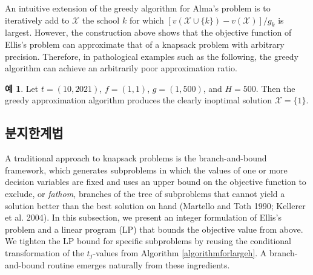 \documentclass[12pt]{article} %
\newif\ifen
\theoremstyle{definition}
\newtheorem{example}{Example}
\theoremstyle{definition}
\newtheorem{example}{예}
\begin{document}
An intuitive extension of the greedy algorithm for Alma's problem is to iteratively add to $\mathcal{X}$ the school $k$ for which $[ v(\mathcal{X}\cup\{k\}) - v(\mathcal{X}) ] / g_k$ is largest. However, the construction above shows that the objective function of Ellis's problem can approximate that of a knapsack problem with arbitrary precision. Therefore, in pathological examples such as the following, the greedy algorithm can achieve an arbitrarily poor approximation ratio. 
\begin{example}
Let $t = (10, 2021)$, $f = (1, 1)$, $g = (1, 500)$, and $H = 500$. Then the greedy approximation algorithm produces the clearly inoptimal solution $\mathcal{X} = \{1\}$. 
\end{example} 

\ifen \subsection{Branch-and-bound algorithm} \else \subsection{분지한계법} \fi
A traditional approach to knapsack problems is the branch-and-bound framework, which generates subproblems in which the values of one or more decision variables are fixed and uses an upper bound on the objective function to exclude, or \emph{fathom,} branches of the tree of subproblems that cannot yield a solution better than the best solution on hand (Martello and Toth 1990; Kellerer et al. 2004). In this subsection, we present an integer formulation of Ellis's problem and a linear program (LP) that bounds the objective value from above. We tighten the LP bound for specific subproblems by reusing the conditional transformation of the $t_j$-values from Algorithm \ref{algorithmforlargeh}. A branch-and-bound routine emerges naturally from these ingredients.
\end{document}
